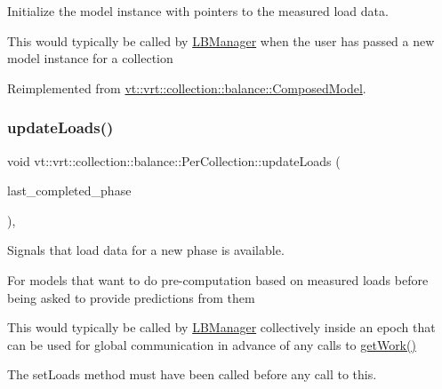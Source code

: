 Initialize the model instance with pointers to the measured load data. 

This would typically be called by \hyperlink{structvt_1_1vrt_1_1collection_1_1balance_1_1_l_b_manager}{L\+B\+Manager} when the user has passed a new model instance for a collection 

Reimplemented from \hyperlink{classvt_1_1vrt_1_1collection_1_1balance_1_1_composed_model_a2f9013d1f135574a03fe5de70ac11862}{vt\+::vrt\+::collection\+::balance\+::\+Composed\+Model}.

\mbox{\label{structvt_1_1vrt_1_1collection_1_1balance_1_1_per_collection_a2b41fbbe2b684654f8dbfd9207b77501}} 
\subsubsection{\texorpdfstring{update\+Loads()}{updateLoads()}}
{\footnotesize\ttfamily void vt\+::vrt\+::collection\+::balance\+::\+Per\+Collection\+::update\+Loads (\begin{DoxyParamCaption}\item[{\hyperlink{namespacevt_a46ce6733d5cdbd735d561b7b4029f6d7}{Phase\+Type}}]{last\+\_\+completed\+\_\+phase }\end{DoxyParamCaption})\hspace{0.3cm}{\ttfamily [override]}, {\ttfamily [virtual]}}



Signals that load data for a new phase is available. 

For models that want to do pre-\/computation based on measured loads before being asked to provide predictions from them

This would typically be called by \hyperlink{structvt_1_1vrt_1_1collection_1_1balance_1_1_l_b_manager}{L\+B\+Manager} collectively inside an epoch that can be used for global communication in advance of any calls to \hyperlink{structvt_1_1vrt_1_1collection_1_1balance_1_1_per_collection_a39813c26fddb8c8cdd6996187f42c173}{get\+Work()}

The {\ttfamily set\+Loads} method must have been called before any call to this. 

